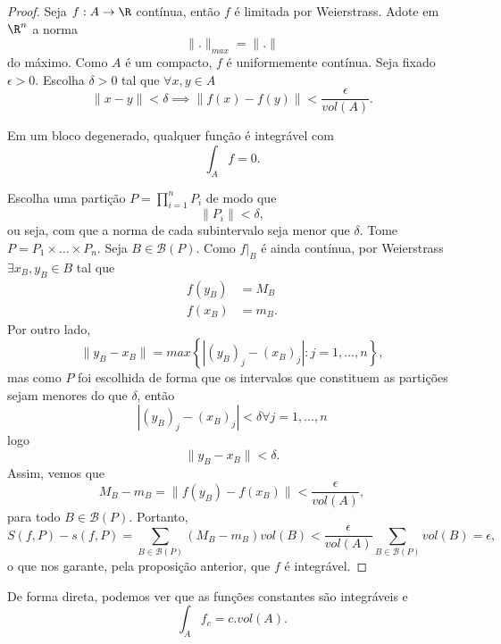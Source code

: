 \begin{proof}
    Seja $f:A\to \R$ contínua, então $f$ é limitada por Weierstrass. Adote em $\R^{n}$ a norma \[
    \|.\|_{max} = \|.\|
    \] do máximo.
    Como $A$ é um compacto, $f$ é uniformemente contínua.
    Seja fixado $\epsilon > 0$. Escolha $\delta > 0$ tal que $\forall x,y \in A$ \[
	\|x-y\|<\delta \implies \|f\left( x \right) -f\left( y \right) \|<\frac{\epsilon}{vol\left( A \right) }
    .\] 

    \begin{remark}
        Em um bloco degenerado, qualquer função é integrável com \[
        \int_A f = 0
        .\] 
    \end{remark}

    Escolha uma partição $P=\prod_{i=1}^{n} P_i  $ de modo que \[
    \|P_i\| < \delta
    ,\] ou seja, com que a norma de cada subintervalo seja menor que $\delta$. Tome $P = P_1\times \ldots\times P_n$. Seja $B \in \mathcal{B}\left( P \right) $. Como $f|_B$ é ainda contínua, por Weierstrass $\exists x_B,y_B\in B$ tal que
    \begin{align*}
	f\left( y_B \right) &= M_B \\
	f\left( x_B \right) &= m_B
    .\end{align*}
    Por outro lado, \[
    \|y_B - x_B\| = max\left\{ |\left( y_B \right)_j - \left( x_B \right)_j | : j = 1,\ldots,n \right\} 
    ,\] mas como $P$ foi escolhida de forma que os intervalos que constituem as partições sejam menores do que $\delta$, então \[
    |\left( y_B \right)_j - \left( x_B \right)_j | < \delta \forall j=1,\ldots,n
    \] logo \[
    \|y_B - x_B\| < \delta
    .\] Assim, vemos que \[
    M_B - m_B = \|f\left( y_B \right) -f\left( x_B \right) \|< \frac{\epsilon}{vol\left( A \right) }
    ,\] para todo $B\in \mathcal{B}\left( P \right) $. Portanto, \[
    S\left( f, P \right) - s\left( f, P \right) = \sum_{B\in \mathcal{B}\left( P \right) } \left( M_B - m_B \right) vol\left( B \right) <\frac{\epsilon}{vol\left( A \right) } \sum_{B\in \mathcal{B}\left( P \right) } vol\left( B \right) = \epsilon
    ,\] o que nos garante, pela proposição anterior, que $f$ é integrável.
\end{proof}

De forma direta, podemos ver que as funções constantes são integráveis e \[
\int_A f_c = c . vol\left( A \right) 
.\] 

